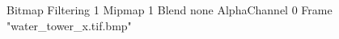 {Bitmap
	{Filtering 1}
	{Mipmap 1}
	{Blend none}
	{AlphaChannel 0}
	{Frame "water_tower_x.tif.bmp"}
}
